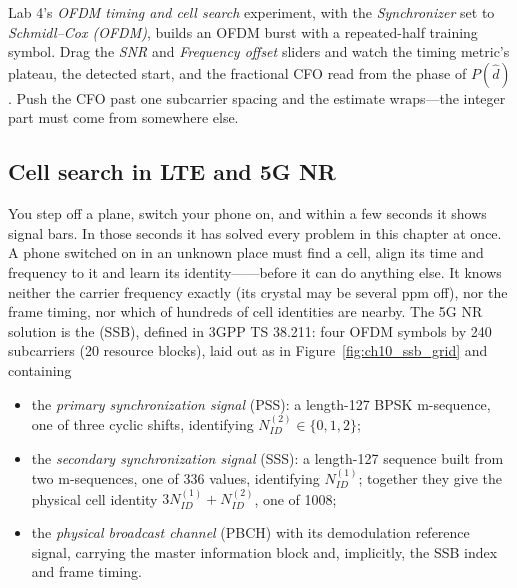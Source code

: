 
\begin{tryit}
Lab 4's \emph{OFDM timing and cell search} experiment, with the \emph{Synchronizer} set to
\emph{Schmidl--Cox (OFDM)}, builds an OFDM burst with a repeated-half training symbol.
Drag the \emph{SNR} and \emph{Frequency offset} sliders and watch the timing metric's plateau, the detected start, and the
fractional CFO read from the phase of $P(\hat d)$. Push the CFO past one subcarrier spacing and
the estimate wraps---the integer part must come from somewhere else.
\end{tryit}


\subsection{Cell search in LTE and 5G NR}

You step off a plane, switch your phone on, and within a few seconds it shows signal bars. In those
seconds it has solved every problem in this chapter at once. A phone switched on in an unknown place
must find a cell, align its time and frequency to it and learn its identity------before
it can do anything else. It knows neither the carrier frequency exactly (its crystal may be several
ppm off), nor the frame timing, nor which of hundreds of cell identities are nearby. The 5G NR solution
is the  (SSB), defined in 3GPP TS 38.211: four OFDM symbols by 240
subcarriers (20 resource blocks), laid out as in Figure~\ref{fig:ch10_ssb_grid} and containing
\begin{itemize}
\item the \emph{primary synchronization signal} (PSS): a length-127 BPSK m-sequence, one of three
cyclic shifts, identifying $N_{ID}^{(2)}\in\{0,1,2\}$;
\item the \emph{secondary synchronization signal} (SSS): a length-127 sequence built from two
m-sequences, one of 336 values, identifying $N_{ID}^{(1)}$; together they give the physical cell identity
$3N_{ID}^{(1)}+N_{ID}^{(2)}$, one of 1008;
\item the \emph{physical broadcast channel} (PBCH) with its demodulation reference signal, carrying
the master information block and, implicitly, the SSB index and frame timing.
\end{itemize}

